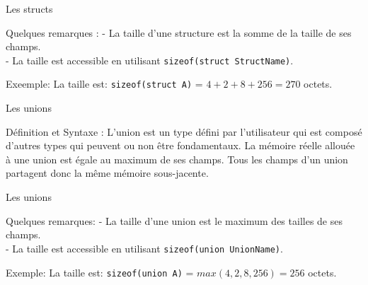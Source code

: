   	\begin{frame}{Les structs}
  		\begin{alertblock}{Quelques remarques :}
  			- La taille d'une structure est la somme de la taille de ses champs. \\
  			- La taille est accessible en utilisant \alert{\texttt{sizeof(struct StructName)}}.
  		\end{alertblock}
  		\begin{exampleblock}{Exeemple:}
  			\structExmp
  			La taille est: \texttt{sizeof(struct A)} = $4 + 2 + 8 + 256 = 270$ octets.
  		\end{exampleblock}
  	\end{frame}
  


 
  	\begin{frame}{Les unions}
  		\begin{block}{Définition et Syntaxe :}
  			L'union est un type défini par l'utilisateur qui est composé d'autres types qui peuvent ou non être fondamentaux. La mémoire réelle allouée à une union est égale au maximum de ses champs. Tous les champs d'un union partagent donc la même mémoire sous-jacente.
  			\unionSyntax
  		\end{block}

  	\end{frame}
  	
  	\begin{frame}{Les unions}
  		\begin{alertblock}{Quelques remarques:}
  			- La taille d'une union est le maximum des tailles de ses champs. \\
  			- La taille est accessible en utilisant \alert{\texttt{sizeof(union UnionName)}}. \\
  		\end{alertblock}
  		\begin{exampleblock}{Exemple:}
  			\unionExmp
  			La taille est: \texttt{sizeof(union A)} = $max(4, 2, 8, 256) = 256$ octets.
  		\end{exampleblock}
  	\end{frame}

